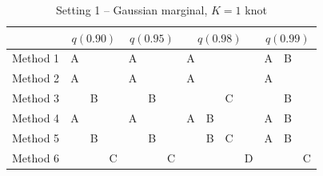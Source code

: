 \documentclass[11pt]{article}
\begin{document}
\begin{table}[htbp]
  \centering
  \caption{Setting 1 -- Gaussian marginal, $K = 1$ knot}
  \label{tbl:gaussim}
  \begin{tabular}{|l|ccc|ccc|cccc|ccc|}
    \cline{2-14}
    \multicolumn{1}{c}{} & \multicolumn{3}{|c}{$q(0.90)$} & \multicolumn{3}{|c}{$q(0.95)$} & \multicolumn{4}{|c}{$q(0.98)$} & \multicolumn{3}{|c|}{$q(0.99)$} \\
    \hline
    Method 1 & A &   &   & A &   &   & A &   &   &   & A & B &   \\
    \hline
    Method 2 & A &   &   & A &   &   & A &   &   &   & A &   &   \\
    \hline
    Method 3 &   & B &   &   & B &   &   &   & C &   &   & B &   \\
    \hline
    Method 4 & A &   &   & A &   &   & A & B &   &   & A & B &   \\
    \hline
    Method 5 &   & B &   &   & B &   &   & B & C &   & A & B &   \\
    \hline
    Method 6 &   &   & C &   &   & C &   &   &   & D &   &   & C \\
    \hline
  \end{tabular}
\end{table}

\end{document}
